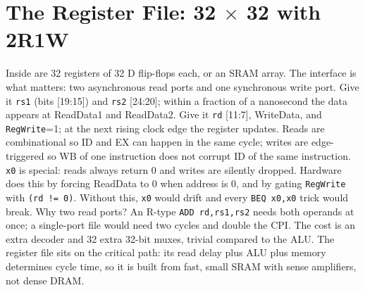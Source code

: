 \section{The Register File: 32 $\times$ 32 with 2R1W}
Inside are 32 registers of 32 D flip-flops each, or an SRAM array. The interface is what matters: two asynchronous read ports and one synchronous write port. Give it \texttt{rs1} (bits [19:15]) and \texttt{rs2} [24:20]; within a fraction of a nanosecond the data appears at ReadData1 and ReadData2. Give it \texttt{rd} [11:7], WriteData, and \texttt{RegWrite}=1; at the next rising clock edge the register updates. Reads are combinational so ID and EX can happen in the same cycle; writes are edge-triggered so WB of one instruction does not corrupt ID of the same instruction.
\texttt{x0} is special: reads always return 0 and writes are silently dropped. Hardware does this by forcing ReadData to 0 when address is 0, and by gating \texttt{RegWrite} with \texttt{(rd != 0)}. Without this, \texttt{x0} would drift and every \texttt{BEQ x0,x0} trick would break.
Why two read ports? An R-type \texttt{ADD rd,rs1,rs2} needs both operands at once; a single-port file would need two cycles and double the CPI. The cost is an extra decoder and 32 extra 32-bit muxes, trivial compared to the ALU. The register file sits on the critical path: its read delay plus ALU plus memory determines cycle time, so it is built from fast, small SRAM with sense amplifiers, not dense DRAM.

